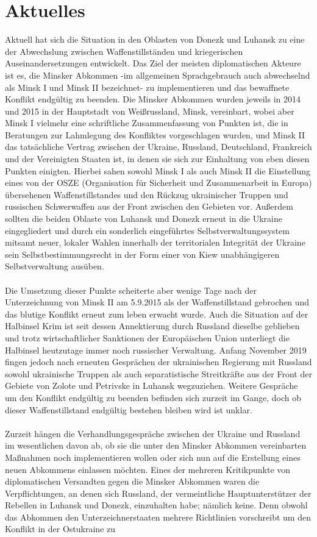 \documentclass[a4paper,11pt]{article}
\begin{document}
    \section{Aktuelles}
   Aktuell hat sich die Situation in den Oblasten von Donezk und Luhansk zu eine der Abwechslung zwischen Waffenstillständen und kriegerischen Auseinandersetzungen entwickelt. Das Ziel der meisten diplomatischen Akteure ist es, die Minsker Abkommen -im allgemeinen Sprachgebrauch auch abwechselnd als Minsk I und  Minsk II bezeichnet- zu implementieren und das bewaffnete Konflikt endgültig zu beenden. Die Minsker Abkommen wurden jeweils in 2014 und 2015 in der Hauptstadt von Weißrussland, Minsk, vereinbart, wobei aber Minsk I vielmehr eine schriftliche Zusammenfassung von Punkten ist, die in Beratungen zur Lahmlegung des Konfliktes vorgeschlagen wurden, und Minsk II das tatsächliche Vertrag zwischen der Ukraine, Russland, Deutschland, Frankreich und der Vereinigten Staaten ist, in denen sie sich zur Einhaltung von eben diesen Punkten einigten. Hierbei sahen sowohl Minsk I als auch Minsk II die Einstellung eines von der OSZE (Organisation für Sicherheit und Zusammenarbeit in Europa) übersehenen Waffenstillstandes und den Rückzug ukrainischer Truppen und russischen Schwerwaffen aus der Front zwischen den Gebieten vor. Außerdem sollten die beiden Oblaste von Luhansk und Donezk erneut in die Ukraine eingegliedert und durch ein sonderlich eingeführtes Selbstverwaltungssystem mitsamt neuer, lokaler Wahlen innerhalb der territorialen Integrität der Ukraine sein Selbstbestimmungsrecht in der Form einer von Kiew unabhängigeren Selbstverwaltung ausüben. \\ \\ Die Umsetzung dieser Punkte scheiterte aber wenige Tage nach der Unterzeichnung von Minsk II am 5.9.2015 als der Waffenstillstand gebrochen und das blutige Konflikt erneut zum leben erwacht wurde. Auch die Situation auf der Halbinsel Krim ist seit dessen Annektierung durch Russland dieselbe geblieben und trotz wirtschaftlicher Sanktionen der Europäischen Union unterliegt die Halbinsel heutzutage immer noch russischer Verwaltung. Anfang November 2019 fingen jedoch nach erneuten Gesprächen der ukrainischen Regierung mit Russland sowohl ukrainische Truppen als auch separatistische Streitkräfte aus der Front der Gebiete von Zolote und Petrivske in Luhansk wegzuziehen. Weitere Gespräche um den Konflikt endgültig zu beenden befinden sich zurzeit im Gange, doch ob dieser Waffenstillstand endgültig bestehen bleiben wird ist unklar. \\ \\ Zurzeit hängen die Verhandlungsgespräche zwischen der Ukraine und Russland im wesentlichen davon ab, ob sie die unter den Minsker Abkommen vereinbarten Maßnahmen noch implementieren wollen oder sich nun auf die Erstellung eines neuen Abkommens einlassen möchten. Eines der mehreren Kritikpunkte von diplomatischen Versandten gegen die Minsker Abkommen waren die Verpflichtungen, an denen sich Russland, der vermeintliche Hauptunterstützer der Rebellen in Luhansk und Donezk, einzuhalten habe; nämlich keine. Denn obwohl das Abkommen den Unterzeichnerstaaten mehrere Richtlinien vorschreibt um den Konflikt in der Ostukraine zu 
\end{document}
